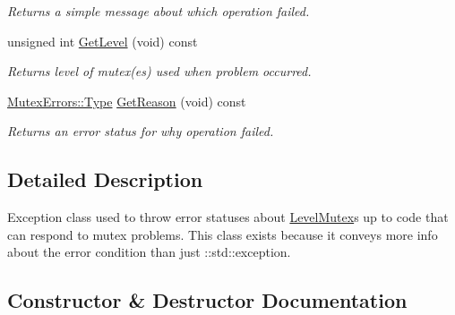 \begin{DoxyCompactItemize}
\begin{DoxyCompactList}\small\item\em Returns a simple message about which operation failed. \end{DoxyCompactList}\item 
\hypertarget{classLoki_1_1MutexException_a9dacfdcd19078fe4ee9ddca3fe61867d}{}unsigned int \hyperlink{classLoki_1_1MutexException_a9dacfdcd19078fe4ee9ddca3fe61867d}{Get\+Level} (void) const \label{classLoki_1_1MutexException_a9dacfdcd19078fe4ee9ddca3fe61867d}

\begin{DoxyCompactList}\small\item\em Returns level of mutex(es) used when problem occurred. \end{DoxyCompactList}\item 
\hypertarget{classLoki_1_1MutexException_a86bcf73eef55b0f64e392f806eb096ad}{}\hyperlink{classLoki_1_1MutexErrors_acd0eb6065ca303083d2e0229d7bff590}{Mutex\+Errors\+::\+Type} \hyperlink{classLoki_1_1MutexException_a86bcf73eef55b0f64e392f806eb096ad}{Get\+Reason} (void) const \label{classLoki_1_1MutexException_a86bcf73eef55b0f64e392f806eb096ad}

\begin{DoxyCompactList}\small\item\em Returns an error status for why operation failed. \end{DoxyCompactList}\end{DoxyCompactItemize}


\subsection{Detailed Description}
Exception class used to throw error statuses about \hyperlink{classLoki_1_1LevelMutex}{Level\+Mutex}\textquotesingle{}s up to code that can respond to mutex problems. This class exists because it conveys more info about the error condition than just \+::std\+::exception. 

\subsection{Constructor \& Destructor Documentation}
\hypertarget{classLoki_1_1MutexException_a0785e768d83f08d5a9f0156827aac238}{}
